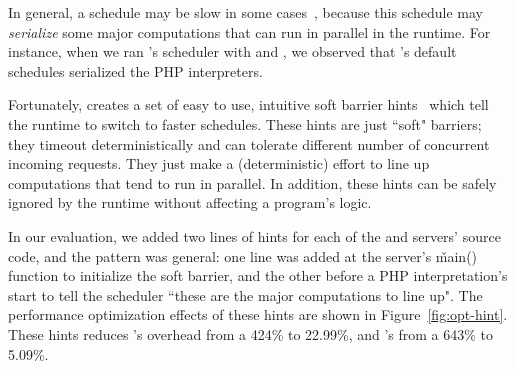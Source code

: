 In general, a \dmt schedule may be slow in some cases~\cite{parrot:sosp13, 
dthreads:sosp11}, because this schedule may \emph{serialize} some major 
computations that can run in parallel in the \pthread runtime. For instance, 
when we ran \xxx's \dmt scheduler \parrot with \apache and \mongoose, we 
observed that \parrot's default schedules serialized the PHP interpreters.

Fortunately, \parrot creates a set of easy to use, intuitive soft barrier 
hints~\cite{parrot:sosp13} which tell the \dmt runtime to switch to faster 
schedules. These hints are just ``soft" barriers; they timeout 
deterministically and can tolerate different number of concurrent incoming 
requests. They just make a (deterministic) effort to line up computations that 
tend to run in parallel. In addition, these hints can be safely ignored by the 
\parrot runtime without affecting a program's logic.

In our evaluation, we added two lines of hints for each of the \apache and 
\mongoose servers' source code, and the pattern was general: one line was 
added at the server's \v{main()} function to initialize the soft barrier, and 
the other before a PHP interpretation's start to tell the \dmt scheduler 
``these are the major computations to line up". The performance optimization 
effects of these hints are shown in Figure~\ref{fig:opt-hint}. These hints 
reduces \apache's overhead from a 424\% to 22.99\%, and \mongoose's from a 643\% 
to 5.09\%.




